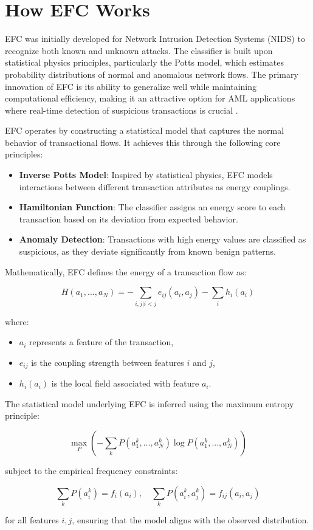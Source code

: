 \section{How EFC Works}
EFC was initially developed for Network Intrusion Detection Systems (NIDS) to
recognize both known and unknown attacks. The classifier is built upon statistical
physics principles, particularly the Potts model, which estimates probability
distributions of normal and anomalous network flows. The primary innovation of
EFC is its ability to generalize well while maintaining computational efficiency,
making it an attractive option for AML applications where real-time detection of
suspicious transactions is crucial \cite{souza2022}.

EFC operates by constructing a statistical model that captures the normal behavior
of transactional flows. It achieves this through the following core principles:

\begin{itemize}
\item \textbf{Inverse Potts Model}: Inspired by statistical physics, EFC models
    interactions between different transaction attributes as energy couplings.
\item \textbf{Hamiltonian Function}: The classifier assigns an energy score to
    each transaction based on its deviation from expected behavior.
\item \textbf{Anomaly Detection}: Transactions with high energy values are classified
    as suspicious, as they deviate significantly from known benign patterns.
\end{itemize}

Mathematically, EFC defines the energy of a transaction flow as:

\begin{equation}
    H(a_1, ..., a_N) = - \sum_{i,j | i<j} e_{ij}(a_i, a_j) - \sum_i h_i(a_i)
\end{equation}

where:
\begin{itemize}
    \item $ a_i $ represents a feature of the transaction,
    \item $ e_{ij} $ is the coupling strength between features $ i $ and $ j $,
    \item $ h_i(a_i) $ is the local field associated with feature $ a_i $.
\end{itemize}

The statistical model underlying EFC is inferred using the maximum entropy principle:

\begin{equation}
    \max_P \left(- \sum_k P(a_1^k, ..., a_N^k) \log P(a_1^k, ..., a_N^k) \right)
\end{equation}

subject to the empirical frequency constraints:

\begin{equation}
    \sum_k P(a_i^k) = f_i(a_i), \quad \sum_k P(a_i^k, a_j^k) = f_{ij}(a_i, a_j)
\end{equation}

for all features $ i, j $, ensuring that the model aligns with the observed distribution.
